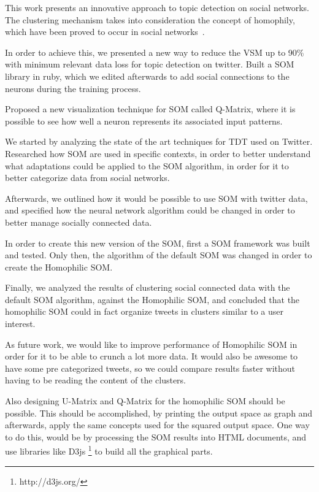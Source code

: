 \label{ch:conclusions}

This work presents an innovative approach to topic detection on social networks. The clustering mechanism takes into consideration the concept of homophily, which have been proved to occur in social  networks~\cite{Wehrens2007}.

In order to achieve this, we presented a new way to reduce the \ac{VSM} up to 90\% with minimum relevant data loss for topic detection on twitter. Built a \ac{SOM} library in ruby,  which we edited afterwards to add social connections to the neurons during the training process.

Proposed a new visualization technique for \ac{SOM} called \ac{Q-Matrix}, where it is possible to see how well a neuron represents its associated input patterns.


We started by analyzing the state of the art techniques for \ac{TDT} used on Twitter. Researched how \ac{SOM} are used in specific contexts, in order to better understand what adaptations could be applied to the \ac{SOM} algorithm, in order for it to better categorize data from social networks.

Afterwards, we outlined how it would be possible to use \ac{SOM} with twitter data, and specified how the neural network algorithm could be changed in order to better manage socially connected data. 

In order to create this new version of the \ac{SOM}, first a \ac{SOM} framework was built and tested. Only then, the algorithm of the default \ac{SOM} was changed in order to create the Homophilic SOM.

Finally, we analyzed the results of clustering social connected data with the default \ac{SOM} algorithm, against the Homophilic SOM, and concluded that the homophilic \ac{SOM} could in fact organize tweets in clusters similar to a user interest.

As future work, we would like to improve performance of Homophilic \ac{SOM} in order for it to be able to crunch a lot more data. It would also be awesome to have some pre categorized tweets, so we could compare results faster without having to be reading the content of the clusters.

Also designing \ac{U-Matrix} and \ac{Q-Matrix} for the homophilic \ac{SOM} should be possible. This should be accomplished, by printing the output space as graph and afterwards,  apply the same concepts used for the squared output space. One way to do this, would be by processing the \ac{SOM} results into HTML documents, and use libraries like D3js \footnote{http://d3js.org/} to build all the graphical parts. 
\cleardoublepage
 
